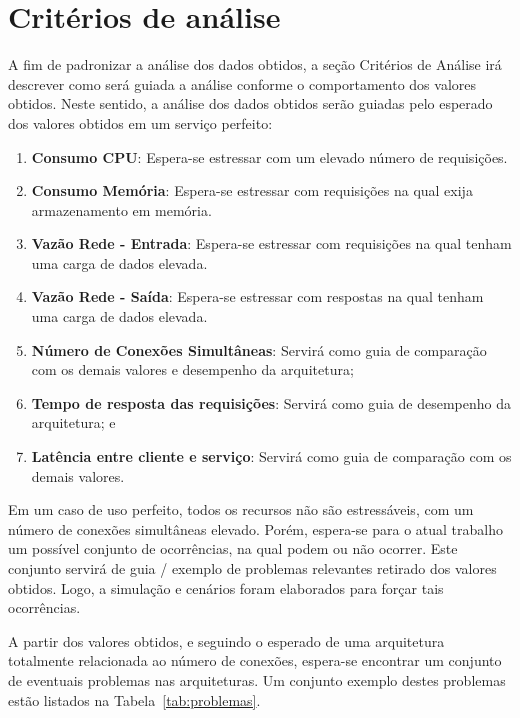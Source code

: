 
\section{Critérios de análise}
\label{sec:criterios}

A fim de padronizar a análise dos dados obtidos, a seção Critérios de Análise irá descrever como será guiada a análise conforme o comportamento dos valores obtidos.
%
Neste sentido, a análise dos dados obtidos serão guiadas pelo esperado dos valores obtidos em um serviço perfeito: %

\begin{enumerate}
  \item \textbf{Consumo CPU}: Espera-se estressar com um elevado número de requisições.
  \item \textbf{Consumo Memória}: Espera-se estressar com requisições na qual exija armazenamento em memória.
  \item \textbf{Vazão Rede - Entrada}: Espera-se estressar com requisições na qual tenham uma carga de dados elevada.
  \item \textbf{Vazão Rede - Saída}: Espera-se estressar com respostas na qual tenham uma carga de dados elevada.
  \item \textbf{Número de Conexões Simultâneas}: Servirá como guia de comparação com os demais valores e desempenho da arquitetura;
  \item \textbf{Tempo de resposta das requisições}: Servirá como guia de desempenho da arquitetura; e
  \item \textbf{Latência entre cliente e serviço}: Servirá como guia de comparação com os demais valores.
\end{enumerate}

Em um caso de uso perfeito, todos os recursos não são estressáveis, com um número de conexões simultâneas elevado.
%
Porém, espera-se para o atual trabalho um possível conjunto de ocorrências, na qual podem ou não ocorrer.
%
Este conjunto servirá de guia / exemplo de problemas relevantes retirado dos valores obtidos.
%
Logo, a simulação e cenários foram elaborados para forçar tais ocorrências.


A partir dos valores obtidos, e seguindo o esperado de uma arquitetura totalmente relacionada ao número de conexões, espera-se encontrar um conjunto de eventuais problemas nas arquiteturas.
%
Um conjunto exemplo destes problemas estão listados na Tabela~\ref{tab:problemas}.

